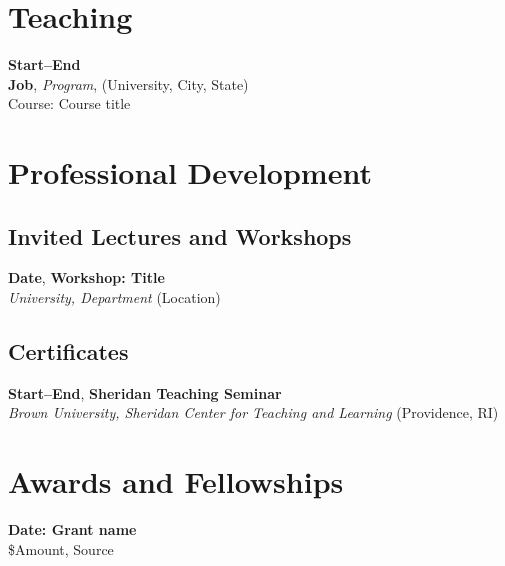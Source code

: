 \section*{Teaching}

\textbf{Start–End}\\
\textbf{Job}, \textit{Program}, (University, City, State)\\
Course: Course title


\vspace{-0\baselineskip}
\section*{Professional Development}

\vspace{-0\baselineskip}
\subsection*{Invited Lectures and Workshops}
\textbf{Date}, \textbf{Workshop: Title} \\
\textit{University, Department} (Location) \\

\vspace{-0\baselineskip}
\subsection*{Certificates}

\textbf{Start–End}, \textbf{Sheridan Teaching Seminar} \\
\textit{Brown University, Sheridan Center for Teaching and Learning} (Providence, RI)


\vspace{-0\baselineskip}
\section*{Awards and Fellowships}

\textbf{Date: Grant name}\\
\$Amount, Source\\